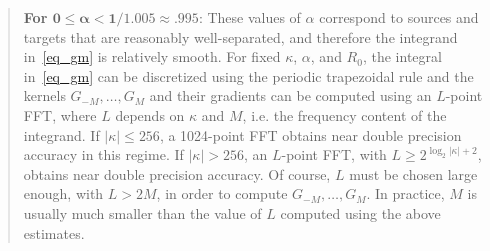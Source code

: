 \documentclass[11pt]{article}
\numberwithin{equation}{section}
\begin{document}

\begin{quote}
\textbf{For $\bm{0 \leq \alpha < 1/1.005 \approx .995}$}: These values
of $\alpha$ correspond to sources and targets that are reasonably
well-separated, and therefore the integrand in~\eqref{eq_gm} is
relatively smooth. For fixed $\kappa$, $\alpha$, and $R_0$, the
integral in~\eqref{eq_gm} can be discretized using the periodic
trapezoidal rule and
the kernels $G_{-M},\ldots,G_{M}$ and their
gradients can be computed using an $L$-point FFT, where $L$ depends on
$\kappa$ and $M$, i.e. the frequency content of the integrand.  If
$|\kappa| \leq 256$, a 1024-point FFT obtains near double precision
accuracy in this regime. If $|\kappa|>256$, an $L$-point FFT, with
$L\geq 2^{\log_2 |\kappa| + 2}$, obtains near double precision
accuracy.  Of course, $L$ must be chosen large enough, with $L > 2M$,
in order to compute $G_{-M},\ldots,G_{M}$. In practice, $M$ is usually much
smaller than the value of $L$ computed using the above estimates.
\end{quote}
\end{document}
